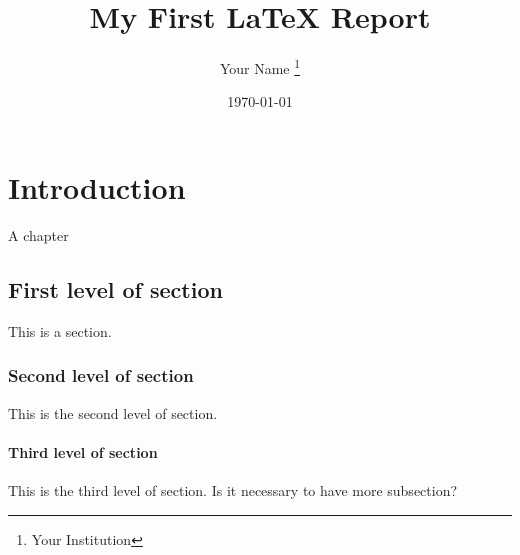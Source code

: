 \documentclass{report}
\title{My First \LaTeX{} Report}
\author{Your Name \thanks{Your Institution}}
\date{\today}
\begin{document}
    \maketitle
    
    \chapter{Introduction}
    
    A chapter
    
    \section{First level of section}
    
    This is a section.
    
    \subsection{Second level of section}
    
    This is the second level of section.
    
    \subsubsection{Third level of section}
    
    This is the third level of section.
    Is it necessary to have more subsection?
    
\end{document}
